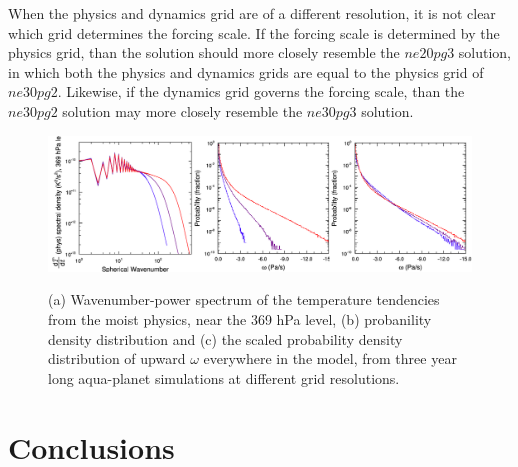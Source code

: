 \documentclass{agujournal}
\begin{document}
When the physics and dynamics grid are of a different resolution, it is not clear which grid determines the forcing scale. If the forcing scale is determined by the physics grid, than the solution should more closely resemble the $ne20pg3$ solution, in which both the physics and dynamics grids are equal to the physics grid of $ne30pg2$. Likewise, if the dynamics grid governs the forcing scale, than the $ne30pg2$ solution may more closely resemble the $ne30pg3$ solution. 

\begin{figure}[t]
\begin{center}
\noindent\includegraphics[width=30pc,angle=0]{figs/pg3panel.png}\\
\end{center}
\caption{(a) Wavenumber-power spectrum of the temperature tendencies from the moist physics, near the 369 hPa level, (b) probanility density distribution and (c) the scaled probability density distribution of upward $\omega$ everywhere in the model, from three year long aqua-planet simulations at different grid resolutions.}
\label{fig:pg3panel}
\end{figure}

\section{Conclusions}




\end{document}
